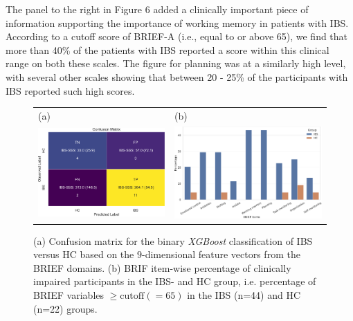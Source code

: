 \documentclass[jcm,article,submit,pdftex,moreauthors]{Definitions/mdpi}
\begin{document}
The panel to the right in Figure 6 added a clinically important piece of information supporting the importance of working memory in patients with IBS. According to a cutoff score of BRIEF-A (i.e., equal to or above 65), we find that more than 40\% of the patients with IBS reported a score within this clinical range on both these scales. The figure for planning was at a similarly high level, with several other scales showing that between 20 - 25\% of the participants with IBS reported such high scores. 



\begin{figure}[H]
\begin{tabular}{ll}
(a) & (b) \\
\includegraphics[width=6.0cm]{Figs/XGboost_prediction_from_BRIEF_CM_heatmap_HC_IBS.pdf} &
\includegraphics[width=7.0cm]{Figs/BRIEF_items_cutoff_65_IBS_vs_HC.pdf}
\end{tabular}
\caption{(a) Confusion matrix for the binary \textit{XGBoost} classification of IBS versus HC based on the $9$-dimensional feature vectors from the BRIEF domains. (b) BRIF item-wise percentage of clinically impaired participants in the IBS- and HC group, i.e. percentage of BRIEF variables $\geq \mbox{cutoff} (= 65)$ in the IBS (n=44) and HC (n=22) groups.}
\end{figure} 


    


\end{document}

